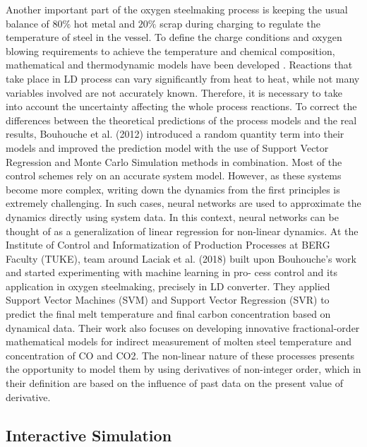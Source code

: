Another important part of the oxygen steelmaking process is keeping the usual balance of $80\%$ hot metal and $20\%$ scrap during charging to regulate the temperature of steel in the vessel. To define the charge conditions and oxygen blowing requirements to achieve the temperature and chemical composition, mathematical and thermodynamic models have been developed \citep{Kacur2019, sprava2017}. Reactions that take place in LD process can vary significantly from heat to heat, while not many variables involved are not accurately known. Therefore, it is necessary to take into account the uncertainty affecting the whole process reactions. To correct the differences between the theoretical predictions of the process models and the real results, Bouhouche et al. (2012) introduced a random quantity term into their models and improved the prediction model with the use of Support Vector Regression and Monte Carlo Simulation methods in combination. Most of the control schemes rely on an accurate system model. However, as these systems become more complex, writing down the dynamics from the first principles is extremely challenging. In such cases, neural networks are used to approximate the dynamics directly using system data. In this context, neural networks can be thought of as a generalization of linear regression for non-linear dynamics. At the Institute of Control and Informatization of Production Processes at BERG Faculty (TUKE), team around Laciak et al. (2018) built upon Bouhouche’s work and started experimenting with machine learning in pro- cess control and its application in oxygen steelmaking, precisely in LD converter. They applied Support Vector Machines (SVM) and Support Vector Regression (SVR) to predict the final melt temperature and final carbon concentration based on dynamical data. Their work also focuses on developing innovative fractional-order mathematical models for indirect measurement of molten steel temperature and concentration of CO and CO2. The non-linear nature of these processes presents the opportunity to model them by using derivatives of non-integer order, which in their definition are based on the influence of past data on the present value of derivative.

\subsection{Interactive Simulation}
\label{interactive-simulation}

